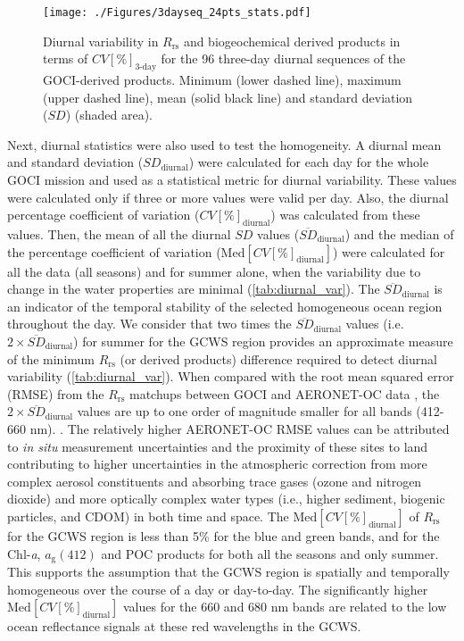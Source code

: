 \documentclass[remotesensing,article,submit,moreauthors,pdftex,10pt,a4paper]{Definitions/mdpi}
\begin{document}
\begin{figure}[htbp!]
\centering
\texttt{[image: ./Figures/3dayseq\_24pts\_stats.pdf]}
\caption{Diurnal variability in $R_\text{rs}$ and biogeochemical derived products in terms of $CV[\%]_\text{3-day}$ for the 96 three-day diurnal sequences of the GOCI-derived products. Minimum (lower dashed line), maximum (upper dashed line), mean (solid black line) and standard deviation ($SD$) (shaded area).\label{fig:3dayseq_stats} } 
\end{figure}
Next, diurnal statistics were also used to test the homogeneity. A diurnal mean and standard deviation ($SD_\text{diurnal}$) were calculated for each day for the whole GOCI mission and used as a statistical metric for diurnal variability. These values were calculated only if three or more values were valid per day. Also, the diurnal percentage coefficient of variation ($CV[\%]_\text{diurnal}$) was calculated from these values. Then, the mean of all the diurnal $SD$ values ($\overline{SD}_\text{diurnal}$) and the median of the percentage coefficient of variation ($\text{Med}[CV[\%]_\text{diurnal}]$) were calculated for all the data (all seasons) and for summer alone, when the variability due to change in the water properties are minimal (\autoref{tab:diurnal_var}). The $\overline{SD}_\text{diurnal}$ is an indicator of the temporal stability of the selected homogeneous ocean region throughout the day. We consider that two times the $\overline{SD}_\text{diurnal}$ values (i.e. $2\times \overline{SD}_\text{diurnal}$) for summer for the GCWS region provides an approximate measure of the minimum $R_\text{rs}$ (or derived products) difference required to detect diurnal variability (\autoref{tab:diurnal_var}). When compared with the root mean squared error (RMSE) from the $R_\text{rs}$ matchups between GOCI and AERONET-OC data \cite{Concha_2018a}, the $2\times \overline{SD}_\text{diurnal}$ values are up to one order of magnitude smaller for all bands (412-660 nm). . The relatively higher AERONET-OC RMSE values can be attributed to {\it in situ} measurement uncertainties and the proximity of these sites to land contributing to higher uncertainties in the atmospheric correction from more complex aerosol constituents and absorbing trace gases (ozone and nitrogen dioxide) and more optically complex water types (i.e., higher sediment, biogenic particles, and CDOM) in both time and space. The $\text{Med}[CV[\%]_\text{diurnal}]$ of $R_\text{rs}$ for the GCWS region is less than 5\% for the blue and green bands, and for the Chl-{\it a}, $a_\text{g}(412)$ and POC products for both all the seasons and only summer. This supports the assumption that the GCWS region is spatially and temporally homogeneous over the course of a day or day-to-day. The significantly higher $\text{Med}[CV[\%]_\text{diurnal}]$ values for the 660 and 680 nm bands are related to the low ocean reflectance signals at these red wavelengths in the GCWS. 
\end{document}
